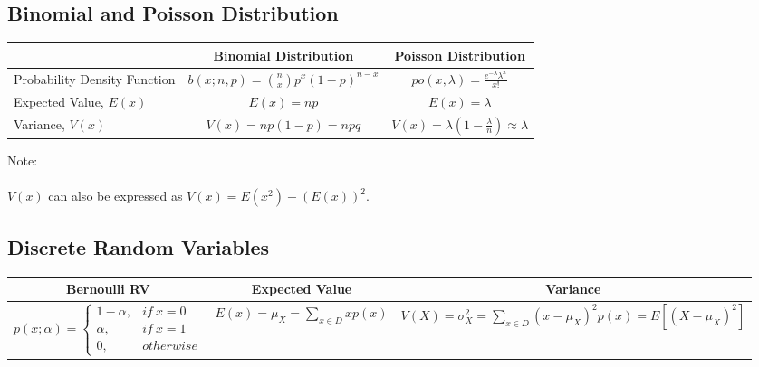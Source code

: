 \documentclass{article}
\begin{document}
\subsection*{Binomial and Poisson Distribution}
\begin{minipage}{.8\textwidth}
\begin{table}[H]
    \centering
    \begin{tabular}{l c c}  
        & Binomial Distribution & Poisson Distribution\\ [0.7ex] \hline \vspace{1ex}
        Probability Density Function & $ \displaystyle b(x;n,p) ={ n \choose x} p^{x}(1-p)^{n-x}$  & $\displaystyle po(x,\lambda) = \frac{e^{-\lambda}\lambda^{x}}{x!}$  \\ [0.5ex]
        Expected Value, $E(x)$ & $E(x) = np$ & $E(x) = \lambda$\\ [0.5ex] 
        Variance, $V(x)$ & $\displaystyle V(x) = np(1-p) = npq$ & $\displaystyle V(x) = \lambda(1-\frac{\lambda}{n})\approx \lambda$  \\ [0.5ex] 
    \end{tabular}
\end{table}
\end{minipage}
\begin{minipage}{.2\textwidth}
\begin{framed}
Note: \\\\
$V(x)$ can also be expressed as $V(x)=E(x^{2})-(E(x))^{2}$.    
\end{framed}

\end{minipage}

\subsection*{Discrete Random Variables}
\begin{table}[H]
    \centering
    \begin{adjustbox}{width=\columnwidth,center}
    \begin{tabular}{c| c| c}  
        Bernoulli RV & Expected Value & Variance\\ [1.0ex] \hline 
        $p(x;\alpha) = \begin{cases}
        1-\alpha, & if \ x=0 \\
        \alpha, & if \ x=1\\
        0, & otherwise
        \end{cases}$
        &
        $\displaystyle E(x)=\mu_{X}=\sum_{x\in D}xp(x)$
        &
        $\displaystyle V(X) = \sigma_{X}^{2}=\sum_{x\in D}(x-\mu_{X})^{2}p(x)=E[(X-\mu_{X})^{2}]$
    \end{tabular}
    \end{adjustbox}
\end{table}
\end{document}
